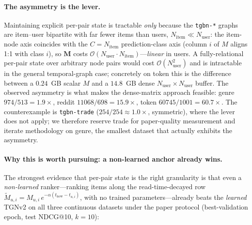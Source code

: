 \documentclass[11pt]{article}
\begin{document}
\paragraph{The asymmetry is the lever.}
Maintaining explicit per-pair state is tractable \emph{only} because the
\texttt{tgbn-*} graphs are item--user bipartite with far fewer items than users,
$N_{\text{item}}\!\ll\!N_{\text{user}}$: the item-node axis coincides with the
$C=N_{\text{item}}$ prediction-class axis (column $i$ of $M$ aligns 1:1 with
class $i$), so $\mathbf{M}$ costs
$\mathcal{O}(N_{\text{user}}\!\cdot\!N_{\text{item}})$---\emph{linear} in users.
A fully-relational per-pair state over arbitrary node pairs would cost
$\mathcal{O}(N_{\text{user}}^2)$ and is intractable in the general
temporal-graph case; concretely on token this is the difference between a
$0.24$~GB scalar $M$ and a $14.8$~GB dense $N_{\text{user}}\!\times\!N_{\text{user}}$
buffer. The observed asymmetry is what makes the dense-matrix approach feasible:
genre $974/513\!=\!1.9\times$, reddit $11068/698\!=\!15.9\times$, token
$60745/1001\!=\!60.7\times$. The counterexample is \texttt{tgbn-trade}
($254/254\!\approx\!1.0\times$, symmetric), where the lever does not apply; we
therefore reserve trade for paper-quality measurement and iterate methodology on
genre, the smallest dataset that actually exhibits the asymmetry.

\paragraph{Why this is worth pursuing: a non-learned anchor already wins.}
The strongest evidence that per-pair state is the right granularity is that even
a \emph{non-learned} ranker---ranking items along the read-time-decayed row
$\tilde M_{u,i}=M_{u,i}\,e^{-\alpha(t_{\text{now}}-t_{u,i})}$, with no trained
parameters---already beats the \emph{learned} TGNv2 on all three continuous
datasets under the paper protocol (best-validation epoch, test NDCG@10, $k=10$):
\end{document}
